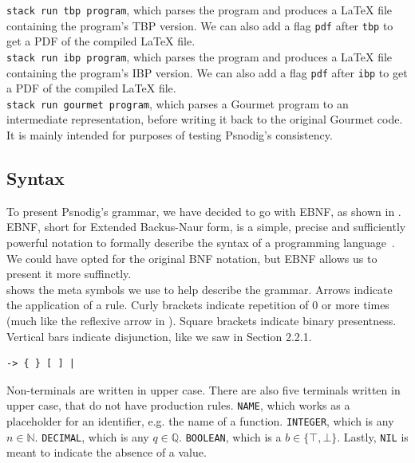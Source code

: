 \texttt{stack run tbp program}, which parses the program and produces a LaTeX file containing the program's TBP version. We can also add a flag \texttt{pdf} after \texttt{tbp} to get a PDF of the compiled LaTeX file. \\

\texttt{stack run ibp program}, which parses the program and produces a LaTeX file containing the program's IBP version. We can also add a flag \texttt{pdf} after \texttt{ibp} to get a PDF of the compiled LaTeX file. \\

\texttt{stack run gourmet program}, which parses a Gourmet program to an intermediate representation, before writing it back to the original Gourmet code. It is mainly intended for purposes of testing Psnodig's consistency.

\subsection{Syntax}

To present Psnodig's grammar, we have decided to go with EBNF, as shown in . EBNF, short for Extended Backus-Naur form, is a simple, precise and sufficiently powerful notation to formally describe the syntax of a programming language~\cite{feynman2016ebnf}. We could have opted for the original BNF notation, but EBNF allows us to present it more suffinctly. \\

 shows the meta symbols we use to help describe the grammar. Arrows indicate the application of a rule. Curly brackets indicate repetition of 0 or more times (much like the reflexive arrow in ). Square brackets indicate binary presentness. Vertical bars indicate disjunction, like we saw in Section 2.2.1. \\

\begin{lstlisting}[caption={Meta symbols used to describe Psnodig's grammar.}, captionpos=b, label={Meta symbols used to describe Psnodig's grammar.}]
-> { } [ ] |
\end{lstlisting}

Non-terminals are written in upper case. There are also five terminals written in upper case, that do not have production rules. \texttt{NAME}, which works as a placeholder for an identifier, e.g. the name of a function. \texttt{INTEGER}, which is any $n \in \mathbb{N}$. \texttt{DECIMAL}, which is any $q \in \mathbb{Q}$. \texttt{BOOLEAN}, which is a $b \in \{\top, \bot \}$. Lastly, \texttt{NIL} is meant to indicate the absence of a value. \\

